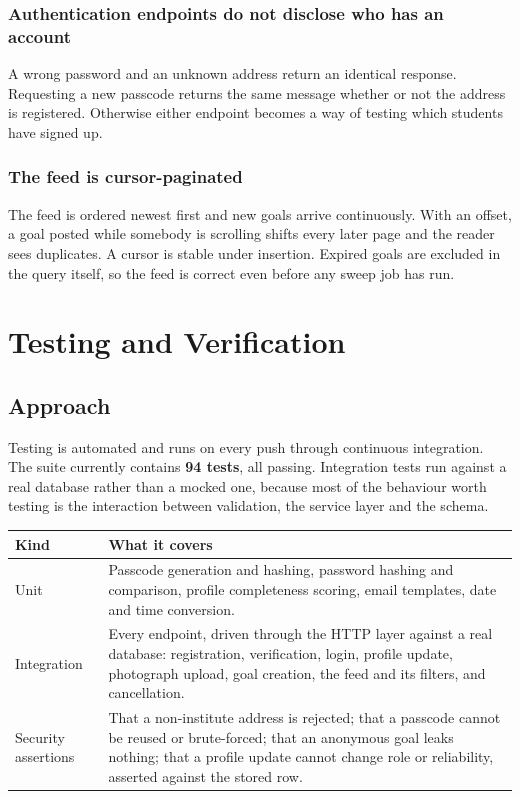 \documentclass[twoside,12pt]{tietreport}
\begin{document}
\subsection{Authentication endpoints do not disclose who has an account}

A wrong password and an unknown address return an identical response. Requesting
a new passcode returns the same message whether or not the address is
registered. Otherwise either endpoint becomes a way of testing which students
have signed up.

\subsection{The feed is cursor-paginated}

The feed is ordered newest first and new goals arrive continuously. With an
offset, a goal posted while somebody is scrolling shifts every later page and the
reader sees duplicates. A cursor is stable under insertion. Expired goals are
excluded in the query itself, so the feed is correct even before any sweep job
has run.

\chapter{Testing and Verification}
\label{ch:testing}

\section{Approach}

Testing is automated and runs on every push through continuous integration. The
suite currently contains \textbf{94 tests}, all passing. Integration tests run
against a real database rather than a mocked one, because most of the behaviour
worth testing is the interaction between validation, the service layer and the
schema.

\begin{longtable}{@{}p{4.2cm}p{9.0cm}@{}}
\toprule
\textbf{Kind} & \textbf{What it covers} \\
\midrule
\endhead
Unit &
Passcode generation and hashing, password hashing and comparison, profile
completeness scoring, email templates, date and time conversion. \\
\addlinespace
Integration &
Every endpoint, driven through the HTTP layer against a real database:
registration, verification, login, profile update, photograph upload, goal
creation, the feed and its filters, and cancellation. \\
\addlinespace
Security assertions &
That a non-institute address is rejected; that a passcode cannot be reused or
brute-forced; that an anonymous goal leaks nothing; that a profile update cannot
change role or reliability, asserted against the stored row. \\
\bottomrule
\end{longtable}
\end{document}

